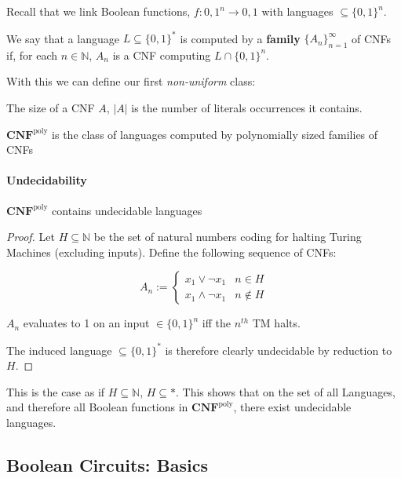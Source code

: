 \documentclass{report}
\newcommand{\N}{\mathbb{N}}
\begin{document}
Recall that we link Boolean functions, $f : { 0,1 }^{n} \rightarrow { 0,1 } $ with languages $\subseteq \{ 0,1 \}^{n} $.

We say that a language $L\subseteq \{ 0,1 \} ^{*}$ is computed by a \textbf{family} $\{ A_{n} \} _{n=1}^{\infty}$ of CNFs if, for each $n\in \N$, $A_{n}$ is a CNF computing $L\cap \{ 0,1 \}^{n} $.

With this we can define our first \textit{non-uniform} class:

\begin{definition}
  The size of a CNF $A$, $|A|$ is the number of literals occurrences it contains.

  $\mathbf{CNF}^{\text{poly}}$ is the class of languages computed by polynomially sized families of CNFs
\end{definition}

\paragraph{Undecidability}

\begin{proposition}
$\mathbf{CNF}^{\text{poly}} $ contains undecidable languages
\end{proposition}

\begin{proof}
  Let $H\subseteq \N$ be the set of natural numbers coding for halting Turing Machines (excluding inputs). Define the following sequence of CNFs:

  \[
    A_{n} := \begin{cases}
      x_{1} \vee \neg x_{1} & n \in H\\
      x_{1} \wedge \neg x_{1} & n \notin H
    \end{cases}
  \]

  $A_{n}$ evaluates to 1 on an input $\in \{ 0,1 \} ^{n}$ iff the $n^{th}$ TM halts.

  The induced language $\subseteq \{ 0,1 \} ^{*}$ is therefore clearly undecidable by reduction to $H$.
\end{proof}

This is the case as if $H\subseteq \N$, $H \subseteq *$. This shows that on the set of all Languages, and therefore all Boolean functions in $\mathbf{CNF}^{\text{poly}} $, there exist undecidable languages.

\subsection{Boolean Circuits: Basics}
\end{document}
